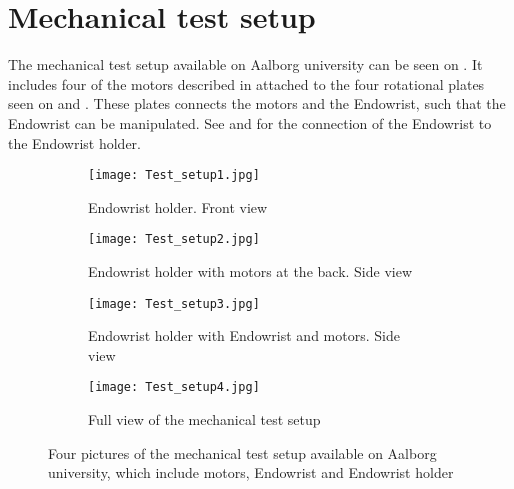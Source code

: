 \section{Mechanical test setup}\label{sec:Mechanical_testsetup.tex}
The mechanical test setup available on Aalborg university can be seen on . It includes four of the motors described in  attached to the four rotational plates seen on  and . These plates connects the motors and the Endowrist, such that the Endowrist can be manipulated. See  and  for the connection of the Endowrist to the Endowrist holder.  

\begin{figure}[H]
	\centering
	\begin{minipage}[t]{0.9\textwidth}
	\begin{subfigure}{0.45\textwidth}
		\vspace{-10pt}
		\centering
		\texttt{[image: Test\_setup1.jpg]}
		\caption{Endowrist holder. Front view}
		\label{fig:Mec_a}
	\end{subfigure}
	\hspace{\fill}
	\begin{subfigure}{0.45\textwidth}
		\centering
		\texttt{[image: Test\_setup2.jpg]}
		\caption{Endowrist holder with motors at the back. Side view}
		\label{fig:Mec_b}
	\end{subfigure}
	\end{minipage}

	\begin{minipage}[t]{0.9\textwidth}
	\vspace{20pt}
	\begin{subfigure}{0.45\textwidth}
		\vspace{0pt}
		\centering
		\texttt{[image: Test\_setup3.jpg]}
		\caption{Endowrist holder with Endowrist and motors. Side view}
		\label{fig:Mec_c}
	\end{subfigure}
	\hspace{\fill}
	\begin{subfigure}{0.45\textwidth}
		\centering
		\texttt{[image: Test\_setup4.jpg]}
		\caption{Full view of the mechanical test setup}
		\label{fig:Mec_d}
	\end{subfigure}
	\end{minipage}

	\caption{Four pictures of the mechanical test setup available on Aalborg university, which include motors, Endowrist and Endowrist holder}
	\label{fig:Mec_abcd}
\end{figure}